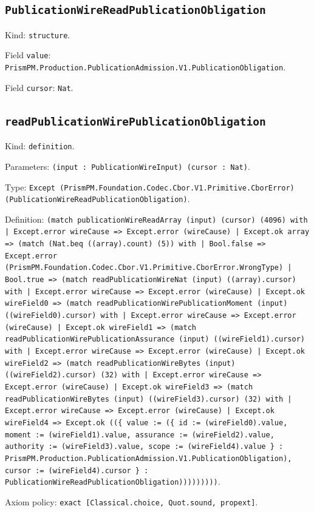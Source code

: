\documentclass[11pt]{article}
\begin{document}
\subsection*{\texttt{PublicationWireReadPublicationObligation}}
\noindent Kind: \texttt{structure}.\par
\noindent Field \texttt{value}: \texttt{PrismPM.Production.PublicationAdmission.V1.PublicationObligation}.\par
\noindent Field \texttt{cursor}: \texttt{Nat}.\par
\subsection*{\texttt{readPublicationWirePublicationObligation}}
\noindent Kind: \texttt{definition}.\par
\noindent Parameters: \texttt{(input : PublicationWireInput) (cursor : Nat)}.\par
\noindent Type: \texttt{Except (PrismPM.Foundation.Codec.Cbor.V1.Primitive.CborError) (PublicationWireReadPublicationObligation)}.\par
\noindent Definition: \texttt{(match publicationWireReadArray (input) (cursor) (4096) with | Except.error wireCause => Except.error (wireCause) | Except.ok array => (match (Nat.beq ((array).count) (5)) with | Bool.false => Except.error (PrismPM.Foundation.Codec.Cbor.V1.Primitive.CborError.WrongType) | Bool.true => (match readPublicationWireNat (input) ((array).cursor) with | Except.error wireCause => Except.error (wireCause) | Except.ok wireField0 => (match readPublicationWirePublicationMoment (input) ((wireField0).cursor) with | Except.error wireCause => Except.error (wireCause) | Except.ok wireField1 => (match readPublicationWirePublicationAssurance (input) ((wireField1).cursor) with | Except.error wireCause => Except.error (wireCause) | Except.ok wireField2 => (match readPublicationWireBytes (input) ((wireField2).cursor) (32) with | Except.error wireCause => Except.error (wireCause) | Except.ok wireField3 => (match readPublicationWireBytes (input) ((wireField3).cursor) (32) with | Except.error wireCause => Except.error (wireCause) | Except.ok wireField4 => Except.ok ((\{ value := (\{ id := (wireField0).value, moment := (wireField1).value, assurance := (wireField2).value, authority := (wireField3).value, scope := (wireField4).value \} : PrismPM.Production.PublicationAdmission.V1.PublicationObligation), cursor := (wireField4).cursor \} : PublicationWireReadPublicationObligation)))))))))}.\par
\noindent Axiom policy: \texttt{exact [Classical.choice, Quot.sound, propext]}.\par
\end{document}
